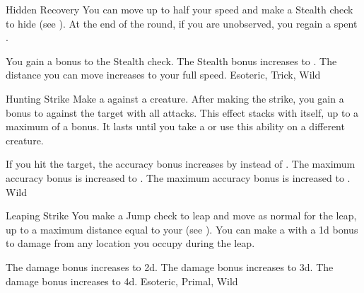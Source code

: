 \lowercase{\hypertarget{maneuver:Hidden Recovery}{}}\label{maneuver:Hidden Recovery}
\begin{freeability}{\hypertarget{maneuver:Hidden Recovery}{Hidden Recovery}}
You can move up to half your speed and make a Stealth check to hide (see ).
At the end of the round, if you are unobserved, you regain a spent .

\rankline
{} You gain a  bonus to the Stealth check.
 The Stealth bonus increases to .
 The distance you can move increases to your full speed.
 Esoteric, Trick, Wild
\end{freeability}
\vspace{0.25em}



\lowercase{\hypertarget{maneuver:Hunting Strike}{}}\label{maneuver:Hunting Strike}
\begin{freeability}{\hypertarget{maneuver:Hunting Strike}{Hunting Strike}}
Make a  against a creature.
After making the strike, you gain a  bonus to  against the target with all attacks.
This effect stacks with itself, up to a maximum of a  bonus.
It lasts until you take a  or use this ability on a different creature.

\rankline
{} If you hit the target, the accuracy bonus increases by  instead of .
 The maximum accuracy bonus is increased to .
 The maximum accuracy bonus is increased to .
 Wild
\end{freeability}
\vspace{0.25em}



\lowercase{\hypertarget{maneuver:Leaping Strike}{}}\label{maneuver:Leaping Strike}
\begin{apability}{\hypertarget{maneuver:Leaping Strike}{Leaping Strike}}
You make a Jump check to leap and move as normal for the leap, up to a maximum distance equal to your  (see ).
You can make a  with a \plus1d bonus to damage from any location you occupy during the leap.

\rankline
{} The damage bonus increases to \plus2d.
 The damage bonus increases to \plus3d.
 The damage bonus increases to \plus4d.
 Esoteric, Primal, Wild
\end{apability}
\vspace{0.25em}



